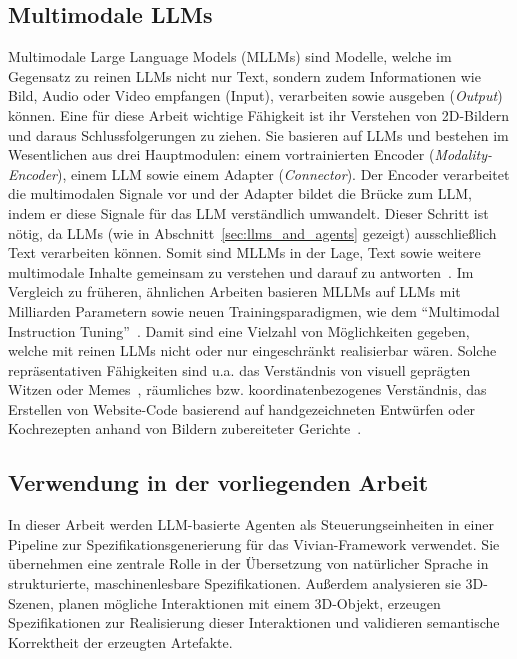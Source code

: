 \subsection*{Multimodale LLMs}

Multimodale Large Language Models (MLLMs) sind Modelle, welche im Gegensatz zu reinen LLMs nicht nur Text, sondern zudem Informationen wie Bild, Audio oder Video empfangen (Input), verarbeiten sowie ausgeben (\textit{Output}) können.
Eine für diese Arbeit wichtige Fähigkeit ist ihr Verstehen von 2D-Bildern und daraus Schlussfolgerungen zu ziehen.
Sie basieren auf LLMs und bestehen im Wesentlichen aus drei Hauptmodulen: einem vortrainierten Encoder (\textit{Modality-Encoder}), einem LLM sowie einem Adapter (\textit{Connector}).
Der Encoder verarbeitet die multimodalen Signale vor und der Adapter bildet die Brücke zum LLM, indem er diese Signale für das LLM verständlich umwandelt.
Dieser Schritt ist nötig, da LLMs (wie in Abschnitt~\ref{sec:llms_and_agents} gezeigt) ausschließlich Text verarbeiten können. Somit sind MLLMs in der Lage, Text sowie weitere multimodale Inhalte gemeinsam zu verstehen und darauf zu antworten~\cite{yinSurveyMultimodalLarge2024, caffagniRevolutionMultimodalLarge2024}.
Im Vergleich zu früheren, ähnlichen Arbeiten basieren MLLMs auf LLMs mit Milliarden Parametern sowie neuen Trainingsparadigmen, wie dem \enquote{Multimodal Instruction Tuning}~\cite{liuVisualInstructionTuning}.
Damit sind eine Vielzahl von Möglichkeiten gegeben, welche mit reinen LLMs nicht oder nur eingeschränkt realisierbar wären.
Solche repräsentativen Fähigkeiten sind u.a. das Verständnis von visuell geprägten Witzen oder Memes~\cite{yangMMREACTPromptingChatGPT2023,zhuMiniGPT4EnhancingVisionLanguage2023}, räumliches bzw. koordinatenbezogenes Verständnis, das Erstellen von Website-Code basierend auf handgezeichneten Entwürfen oder Kochrezepten anhand von Bildern zubereiteter Gerichte~\cite{zhuMiniGPT4EnhancingVisionLanguage2023}.

\subsection*{Verwendung in der vorliegenden Arbeit}

In dieser Arbeit werden LLM-basierte Agenten als Steuerungseinheiten in einer Pipeline zur Spezifikationsgenerierung für das Vivian-Framework verwendet.
Sie übernehmen eine zentrale Rolle in der Übersetzung von natürlicher Sprache in strukturierte, maschinenlesbare Spezifikationen.
Außerdem analysieren sie 3D-Szenen, planen mögliche Interaktionen mit einem 3D-Objekt, erzeugen Spezifikationen zur Realisierung dieser Interaktionen und validieren semantische Korrektheit der erzeugten Artefakte.





